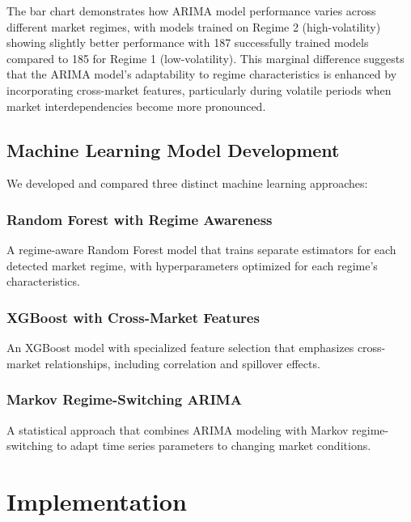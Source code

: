 \documentclass[conference]{IEEEtran}
\begin{document}
The bar chart demonstrates how ARIMA model performance varies across different market regimes, with models trained on Regime 2 (high-volatility) showing slightly better performance with 187 successfully trained models compared to 185 for Regime 1 (low-volatility). This marginal difference suggests that the ARIMA model's adaptability to regime characteristics is enhanced by incorporating cross-market features, particularly during volatile periods when market interdependencies become more pronounced.

\subsection{Machine Learning Model Development}
We developed and compared three distinct machine learning approaches:

\subsubsection{Random Forest with Regime Awareness}
A regime-aware Random Forest model that trains separate estimators for each detected market regime, with hyperparameters optimized for each regime's characteristics.

\subsubsection{XGBoost with Cross-Market Features}
An XGBoost model with specialized feature selection that emphasizes cross-market relationships, including correlation and spillover effects.

\subsubsection{Markov Regime-Switching ARIMA}
A statistical approach that combines ARIMA modeling with Markov regime-switching to adapt time series parameters to changing market conditions.

\section{Implementation}
\end{document}
